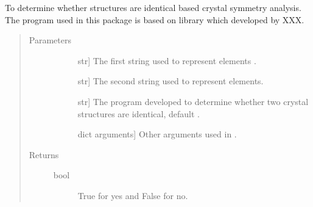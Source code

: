 \documentclass[letterpaper,10pt,english]{sphinxmanual}
\begin{document}
\begin{fulllineitems}
\begin{fulllineitems}
\label{\detokenize{pygace:pygace.ce.CE.CORRDUMP}}
\end{fulllineitems}


\begin{fulllineitems}
\label{\detokenize{pygace:pygace.ce.CE.compare_crystal}}
\sphinxAtStartPar
To determine whether structures are identical based crystal symmetry
analysis. The program used in this package is based on  library
which developed by XXX.
\begin{quote}\begin{description}
\item[{Parameters}] \leavevmode\begin{description}
\item[{}] \leavevmode{[}str{]}
\sphinxAtStartPar
The first string used to represent elements .

\item[{}] \leavevmode{[}str{]}
\sphinxAtStartPar
The second string used to represent elements.

\item[{}] \leavevmode{[}str{]}
\sphinxAtStartPar
The program developed to determine whether two
crystal structures are identical, default .

\item[{}] \leavevmode{[}dict arguments{]}
\sphinxAtStartPar
Other arguments used in .

\end{description}

\item[{Returns}] \leavevmode\begin{description}
\item[{bool}] \leavevmode
\sphinxAtStartPar
True for yes and False for no.


\end{description}
\end{description}
\end{quote}
\end{fulllineitems}
\end{fulllineitems}
\end{document}

